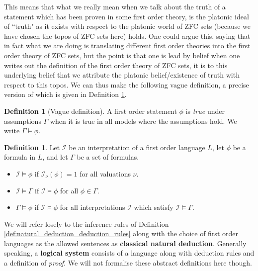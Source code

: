 \documentclass[12pt]{article}
\theoremstyle{plain}
\theoremstyle{definition}
\newtheorem{defn}[thm]{Definition} %
\newcommand{\call}[1]{\mathcal{#1}}
\begin{document}
	This means that what we really mean when we talk about the truth of a statement which has been proven in some first order theory, is the platonic ideal of ``truth" as it exists with respect to the platonic world of ZFC sets (because we have chosen the topos of ZFC sets here) holds. One could argue this, saying that in fact what we are doing is translating different first order theories into the first order theory of ZFC sets, but the point is that one is lead by belief when one writes out the definition of the first order theory of ZFC sets, it is to this underlying belief that we attribute the platonic belief/existence of truth with respect to this topos. We can thus make the following vague definition, a precise version of which is given in Definition \ref{def:models}.
	
	\begin{defn}[Vague definition] A first order statement $\phi$ is \emph{true} under assumptions $\Gamma$ when it is true in all models where the assumptions hold. We write $\Gamma \models \phi$.
		\end{defn}
	
	\begin{defn}\label{def:models}
		Let $\call{I}$ be an interpretation of a first order language $L$, let $\phi$ be a formula in $L$, and let $\Gamma$ be a set of formulas.
		\begin{itemize}
			\item $\call{I} \models \phi$ if $\call{I}_\nu(\phi) = 1$ for all valuations $\nu$.
			\item $\call{I} \models \Gamma$ if $\call{I} \models \phi$ for all $\phi \in \Gamma$.
			\item $\Gamma \models \phi$ if $\call{I} \models \phi$ for all interpretations $\call{I}$ which satisfy $\call{I} \models \Gamma$.
			\end{itemize}
		\end{defn}
	
	We will refer losely to the inference rules of Definition \ref{def:natural_deduction_deduction_rules} along with the choice of first order languages as the allowed sentences as \textbf{classical natural deduction}. Generally speaking, a \textbf{logical system} consists of a language along with deduction rules and a definition of \emph{proof}. We will not formalise these abstract definitions here though.
	
\end{document}
